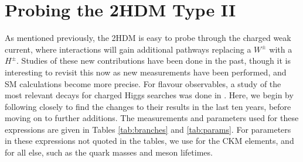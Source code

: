 \documentclass[a4paper,12pt]{article}
\begin{document}
\section{Probing the 2HDM Type II}
\label{sec:probe}
As mentioned previously, the 2HDM is easy to probe through the charged weak current, where interactions will gain additional pathways replacing a $W^{\pm}$ with a $H^{\pm}$. 
Studies of these new contributions have been done in the past, though it is interesting to revisit this now as new measurements have been performed, and SM calculations become more precise.
For flavour observables, a study of the most relevant decays for charged Higgs searches was done in \cite{desc}.
Here, we begin by following \cite{desc} closely to find the changes to their results in the last ten years, before moving on to further additions. 
The measurements and parameters used for these expressions are given in Tables \ref{tab:branches} and \ref{tab:params}.
For parameters in these expressions not quoted in the tables, we use \cite{ckm} for the CKM elements, and \cite{pdg} for all else, such as the quark masses and meson lifetimes.
\end{document}
